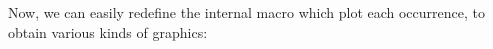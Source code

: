 \documentclass{article}
\begin{document}
\makeatletter

\def\Character@AsciiCode#1#2{\chardef#2=`#1\relax}%

\newarray\AssociativeArray@Indexes

\def\AssociativeArray(#1)=#2{%
\expandarrayelementtrue
\AssociativeArray@ElementFoundfalse
\edef\@tempa{#1}%
\edef\@tempb{#2}%
\Multido{\iValue=\@ne+\@ne}{\AssociativeArrayNbValues}{%
  \checkAssociativeArray@Names(\iValue)%
  \ifx\@tempa\cachedata
    \AssociativeArray@Values(\iValue)={\@tempb}%
    \AssociativeArray@ElementFoundtrue
    \multidostop
  \fi}
\ifAssociativeArray@ElementFound
\else
  \@tempcnta=\@ne
  \expandafter\Character@AsciiCode\@tempa\@tempx
  \Multido{\iValue=\@ne+\@ne}{\AssociativeArrayNbValues}{%
    \checkAssociativeArray@Names(\iValue)%
    \expandafter\Character@AsciiCode\cachedata\@tempy
    \ifnum\@tempx<\@tempy
      \checkAssociativeArray@Indexes(\iValue)%
      \@tempcntb=\cachedata
      \advance\@tempcntb\@ne
      \AssociativeArray@Indexes(\iValue)={\the\@tempcntb}%
    \else
      \advance\@tempcnta\@ne
    \fi}
  \advance\AssociativeArrayNbValues\@ne
  \AssociativeArray@Names(\AssociativeArrayNbValues)={\@tempa}%
  \AssociativeArray@Values(\AssociativeArrayNbValues)={\@tempb}%
  \AssociativeArray@Indexes(\AssociativeArrayNbValues)={\the\@tempcnta}%
\fi}

\def\Draw@OneOccurrence#1{%
\checkAssociativeArray@Indexes(#1)%
\pst@cnta=\cachedata
\checkAssociativeArray@Values(#1)%
\psdot(\the\pst@cnta,\cachedata)
\rput[B](\the\pst@cnta,-0.5){\AssociativeArray@Names(#1)}}

\makeatother

\begin{CenterExample}
\end{CenterExample}

\noindent Now, we can easily redefine the internal macro which plot each
occurrence, to obtain various kinds of graphics:
\end{document}
